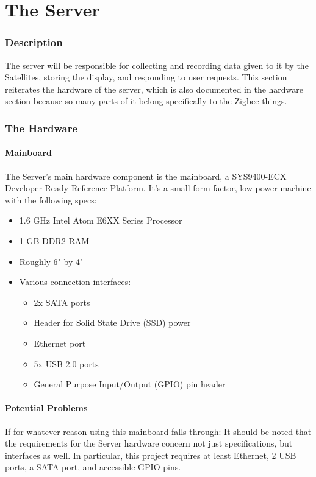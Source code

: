 \chapter{The Server}

\subsection{Description}

The server will be responsible for collecting and recording data given to it by the Satellites, storing the display, and responding to user requests. 
This section reiterates the hardware of the server, which is also documented in the hardware section because so many parts of it belong specifically to the Zigbee things.

\subsection{The Hardware}

\subsubsection{Mainboard}
The Server's main hardware component is the mainboard, a SYS9400-ECX Developer-Ready Reference Platform. 
It's a small form-factor, low-power machine with the following specs:

\begin{itemize}
	\item 1.6 GHz Intel Atom E6XX Series Processor
	\item 1 GB DDR2 RAM
	\item Roughly 6" by 4"
	\item Various connection interfaces:
	\begin{itemize}
		\item 2x SATA ports
		\item Header for Solid State Drive (SSD) power
		\item Ethernet port
		\item 5x USB 2.0 ports
		\item General Purpose Input/Output (GPIO) pin header
	\end{itemize}
\end{itemize}

\subsubsection{Potential Problems}
If for whatever reason using this mainboard falls through: 
It should be noted that the requirements for the Server hardware concern not just specifications, but interfaces as well.
In particular, this project requires at least Ethernet, 2 USB ports, a SATA port, and accessible GPIO pins.

